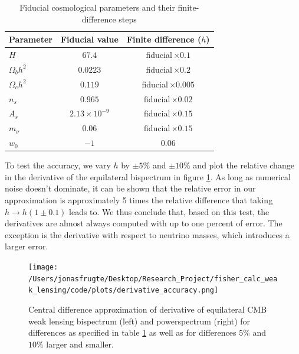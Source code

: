 \documentclass[11pt]{article} %
\begin{document}
\begin{table}[h]
    \centering
    \begin{tabular}{lcc}
    \toprule
    Parameter & Fiducial value & Finite difference ($h$) \\
    \midrule
    $H$            & $67.4$               & fiducial\,$\times0.1$   \\
    $\Omega_b h^2$ & $0.0223$             & fiducial\,$\times0.2$   \\
    $\Omega_c h^2$ & $0.119$              & fiducial\,$\times0.005$ \\
    $n_s$          & $0.965$              & fiducial\,$\times0.02$ \\
    $A_s$          & $2.13\times10^{-9}$  & fiducial\,$\times0.15$   \\
    $m_\nu$        & $0.06$               & fiducial\,$\times0.15$   \\
    $w_0$          & $-1$                 & $0.06$                  \\
    \bottomrule
    \end{tabular}
    \caption{Fiducial cosmological parameters and their finite-difference steps}
    \label{tab:cosmo-params-diff}
\end{table}
    
    

To test the accuracy, we vary $h$ by $\pm 5\%$ and $\pm 10\%$ and plot the relative change in the derivative of the equilateral bispectrum in figure \ref{fig:deraccuracy}. As long as numerical noise doesn't dominate, it can be shown that the relative error in our approximation is approximately 5 times the relative difference that taking $h \rightarrow h(1 \pm 0.1)$ leads to. We thus conclude that, based on this test, the derivatives are almost always computed with up to one percent of error. The exception is the derivative with respect to neutrino masses, which introduces a larger error. 

\begin{figure}[t]
    \centering
    \texttt{[image: /Users/jonasfrugte/Desktop/Research\_Project/fisher\_calc\_weak\_lensing/code/plots/derivative\_accuracy.png]}
    \caption{Central difference approximation of derivative of equilateral CMB weak lensing bispectrum (left) and powerspectrum (right) for differences as specified in table \ref{tab:cosmo-params-diff} as well as for differences $5\%$ and $10\%$ larger and smaller.}
    \label{fig:deraccuracy}
\end{figure}
\end{document}
